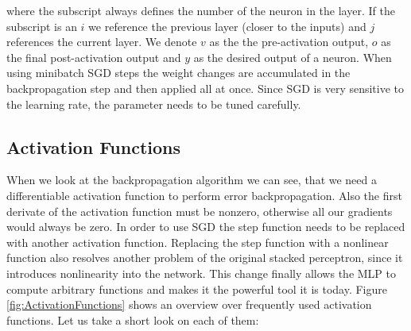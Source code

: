 where the subscript always defines the number of the neuron in the layer. If the subscript is an $i$ we reference the previous layer (closer to the inputs) and $j$ references the current layer. We denote $v$ as the the pre-activation output, $o$ as the final post-activation output and $y$ as the desired output of a neuron.
When using minibatch SGD steps the weight changes are accumulated in the backpropagation step and then applied all at once. Since SGD is very sensitive to the learning rate, the parameter needs to be tuned carefully.

\subsection{Activation Functions} \label{ssec:ActivationFunctions}
When we look at the backpropagation algorithm we can see, that we need a differentiable activation function to perform error backpropagation. Also the first derivate of the activation function must be nonzero, otherwise all our gradients would always be zero. In order to use SGD the step function needs to be replaced with another activation function. Replacing the step function with a nonlinear function also resolves another problem of the original stacked perceptron, since it introduces nonlinearity into the network. This change finally allows the MLP to compute arbitrary functions and makes it the powerful tool it is today. Figure \ref{fig:ActivationFunctions} shows an overview over frequently used activation functions. Let us take a short look on each of them:


